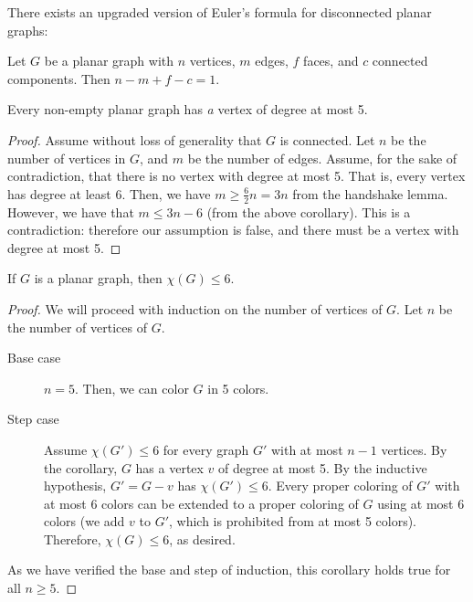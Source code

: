 
There exists an upgraded version of Euler's formula for disconnected planar graphs:

\begin{theorem}
	Let \( G \) be a planar graph with \( n \) vertices, \( m \) edges, \( f \) faces, and \( c \) connected components. Then \( n - m + f - c= 1 \).
\end{theorem}

\begin{corollary}
	Every non-empty planar graph has \emph{a} vertex of degree at most 5.
\end{corollary}

\begin{proof}
	Assume without loss of generality that \( G \) is connected. Let \( n \) be the number of vertices in \( G \), and \( m \) be the number of edges. Assume, for the sake of contradiction, that there is no vertex with degree at most 5. That is, every vertex has degree at least 6. Then, we have \( m \ge \frac{6}{2}n = 3n \) from the handshake lemma. However, we have that \( m \le 3n-6 \) (from the above corollary). This is a contradiction: therefore our assumption is false, and there must be a vertex with degree at most 5.
\end{proof}

\begin{corollary}
	If \( G \) is a planar graph, then \( \chi(G) \le 6 \).
\end{corollary}

\begin{proof}
	We will proceed with induction on the number of vertices of \( G \). Let \( n \) be the number of vertices of \( G \).
	\begin{description}
		\item[Base case] \( n=5 \). Then, we can color \( G \) in 5 colors.
		\item[Step case] Assume \( \chi(G') \le 6 \) for every graph \( G' \) with at most \( n -1  \) vertices. By the corollary, \( G \) has a vertex \( v \) of degree at most 5. By the inductive hypothesis, \( G' = G - v \) has \( \chi(G') \le 6 \). Every proper coloring of \( G' \) with at most 6 colors can be extended to a proper coloring of \( G \) using at most 6 colors (we add \( v \) to \( G' \), which is prohibited from at most 5 colors). Therefore, \( \chi(G) \le 6 \), as desired.
	\end{description}
	As we have verified the base and step of induction, this corollary holds true for all \( n\ge 5 \).
\end{proof}

